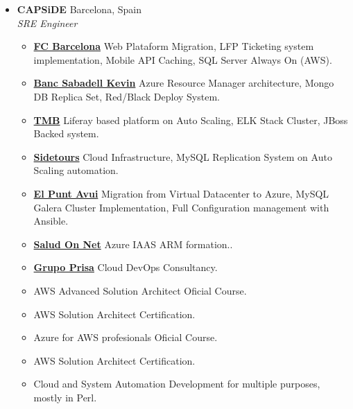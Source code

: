 \documentclass[]{friggeri-cv} %
\renewenvironment{entrylist}{%
  \begin{itemize}[leftmargin=1in]%
}{%
  \end{itemize}
}
\renewcommand{\entry}[4]{%
  \item[#1]
    \textbf{#2}%
    \hfill%
    {\footnotesize\addfontfeature{Color=lightgray} #3}\\%
    #4\vspace{\parsep}%
  }
\begin{document}
\begin{entrylist}
\entry
{2014--2016}
{CAPSiDE}
{Barcelona, Spain}
{\emph{SRE Engineer} 
\begin{itemize}[label=\textbullet]
    \item \href{http://www.fcbarcelona.com/}{\textbf{FC Barcelona}} Web Plataform Migration, LFP Ticketing system implementation, Mobile API Caching, SQL Server Always On (AWS). 
\item \href{http://kelvinretail.com/}{\textbf{Banc Sabadell Kevin}} Azure Resource Manager architecture, Mongo DB Replica Set, Red/Black Deploy System.
\item \href{http://www.tmb.cat/}{\textbf{TMB}} Liferay based platform on Auto Scaling, ELK Stack Cluster, JBoss Backed system.
\item \href{http://www.sidetours.com/}{\textbf{Sidetours}} Cloud Infrastructure, MySQL Replication System on Auto Scaling automation.
\item \href{http://www.elpuntavui.cat/}{\textbf{El Punt Avui}} Migration from Virtual Datacenter to Azure, MySQL Galera Cluster Implementation, Full Configuration management with Ansible.
\item \href{https://www.saludonnet.com/}{\textbf{Salud On Net}} Azure IAAS ARM formation..
\item \href{http://www.prisa.com/}{\textbf{Grupo Prisa}} Cloud DevOps Consultancy.
\item AWS Advanced Solution Architect Oficial Course.  
\item AWS Solution Architect Certification. 
\item Azure for AWS profesionals Oficial Course. 
\item AWS Solution Architect Certification. 
\item Cloud and System Automation Development for multiple purposes, mostly in Perl.
\end{itemize}}


\end{entrylist}
\end{document}
